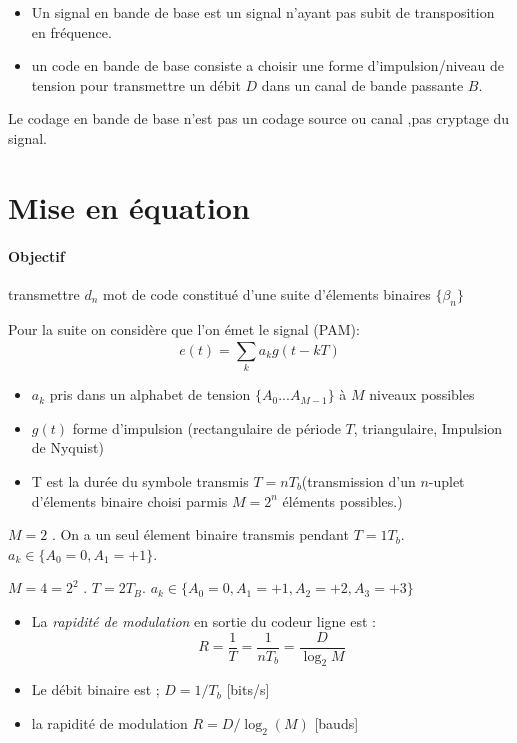 \documentclass[main.tex]{subfiles}
\begin{document}
\begin{defin}
  \begin{itemize}
  \item Un signal en bande de base est un signal n'ayant pas subit de
    transposition en fréquence.
    \item un code en bande de base consiste a choisir une forme d'impulsion/niveau de tension pour transmettre un débit $D$ dans un canal de bande passante $B$.
\end{itemize}
\end{defin}

\begin{rem}
  Le codage en bande de base n'est pas un codage source ou canal ,pas cryptage du signal.
\end{rem}
\section{Mise en équation}

\paragraph{Objectif} transmettre $d_n$ mot de code constitué d'une suite d'élements binaires $\{\beta_n\}$
\begin{defin}
Pour la suite on considère que l'on émet le signal (PAM):
\[
  e(t)  = \sum_{k}^{}a_kg(t-kT)
\]
\begin{itemize}
\item $a_k$ pris dans un alphabet de tension $\{A_0 ... A_{M-1}\}$ à $M$ niveaux possibles
\item $g(t)$ forme d'impulsion (rectangulaire de période $T$, triangulaire, Impulsion de Nyquist)
\item T est la durée du symbole transmis  $T = nT_b$(transmission d'un $n$-uplet d'élements binaire choisi parmis $M=2^n$ éléments possibles.)
\end{itemize}
\end{defin}

\begin{exemple}
  $M=2$ . On a un seul élement binaire transmis pendant $T= 1 T_b$. $a_k\in\{A_0=0, A_1=+1 \}$.
\end{exemple}
\begin{exemple}
  $M=4=2^2$ . $T=2T_B$. $a_k\in\{A_0=0,A_1=+1,A_2=+2,A_3=+3\}$
\end{exemple}
\begin{defin}
  \begin{itemize}
  \item La\emph{ rapidité de modulation }en sortie du codeur ligne est :
  \[
    R = \frac{1}{T}= \frac{1}{nT_b}=\frac{D}{\log_2{M}}
  \]
  \item Le débit binaire est ; $D=1/T_b$ [bits/s]
  \item la rapidité de modulation $R=D/\log_2(M)$ [bauds]
\end{itemize}
\end{defin}
\end{document}
